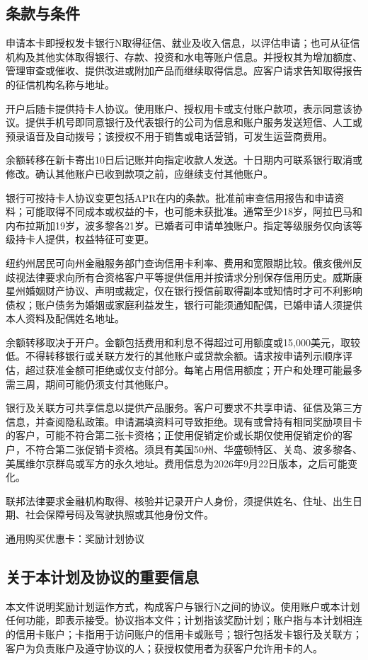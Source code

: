 \documentclass[UTF8,fontset=none,11pt,a4paper]{ctexart}
\begin{document}
\subsection*{条款与条件}
申请本卡即授权发卡银行N取得征信、就业及收入信息，以评估申请；也可从征信机构及其他实体取得银行、存款、投资和水电等账户信息。并授权其为增加额度、管理审查或催收、提供改进或附加产品而继续取得信息。应客户请求告知取得报告的征信机构名称与地址。


开户后随卡提供持卡人协议。使用账户、授权用卡或支付账户款项，表示同意该协议。提供手机号即同意银行及代表银行的公司为信息和账户服务发送短信、人工或预录语音及自动拨号；该授权不用于销售或电话营销，可发生运营商费用。


余额转移在新卡寄出10日后记账并向指定收款人发送。十日期内可联系银行取消或修改。确认其他账户已收到款项之前，应继续支付其他账户。


银行可按持卡人协议变更包括APR在内的条款。批准前审查信用报告和申请资料；可能取得不同成本或权益的卡，也可能未获批准。通常至少18岁，阿拉巴马和内布拉斯加19岁，波多黎各21岁。已婚者可申请单独账户。指定等级服务仅向该等级持卡人提供，权益特征可变更。


纽约州居民可向州金融服务部门查询信用卡利率、费用和宽限期比较。俄亥俄州反歧视法律要求向所有合资格客户平等提供信用并按请求分别保存信用历史。威斯康星州婚姻财产协议、声明或裁定，仅在银行授信前取得副本或知情时才可不利影响债权；账户债务为婚姻或家庭利益发生，银行可能须通知配偶，已婚申请人须提供本人资料及配偶姓名地址。


余额转移取决于开户。金额包括费用和利息不得超过可用额度或15,000美元，取较低。不得转移银行或关联方发行的其他账户或贷款余额。请求按申请列示顺序评估，超过获准金额可拒绝或仅支付部分。每笔占用信用额度；开户和处理可能最多需三周，期间可能仍须支付其他账户。


银行及关联方可共享信息以提供产品服务。客户可要求不共享申请、征信及第三方信息，并查阅隐私政策。申请漏填资料可导致拒绝。现有或曾持有相同奖励项目卡的客户，可能不符合第二张卡资格；正使用促销定价或长期仅使用促销定价的客户，不符合第二张促销卡资格。须具有美国50州、华盛顿特区、关岛、波多黎各、美属维尔京群岛或军方的永久地址。费用信息为2026年9月22日版本，之后可能变化。


联邦法律要求金融机构取得、核验并记录开户人身份，须提供姓名、住址、出生日期、社会保障号码及驾驶执照或其他身份文件。


通用购买优惠卡：奖励计划协议


\subsection*{关于本计划及协议的重要信息}
本文件说明奖励计划运作方式，构成客户与银行N之间的协议。使用账户或本计划任何功能，即表示接受。协议指本文件；计划指该奖励计划；账户指与本计划相连的信用卡账户；卡指用于访问账户的信用卡或账号；银行包括发卡银行及关联方；客户为负责账户及遵守协议的人；获授权使用者为获客户允许用卡的人。
\end{document}
